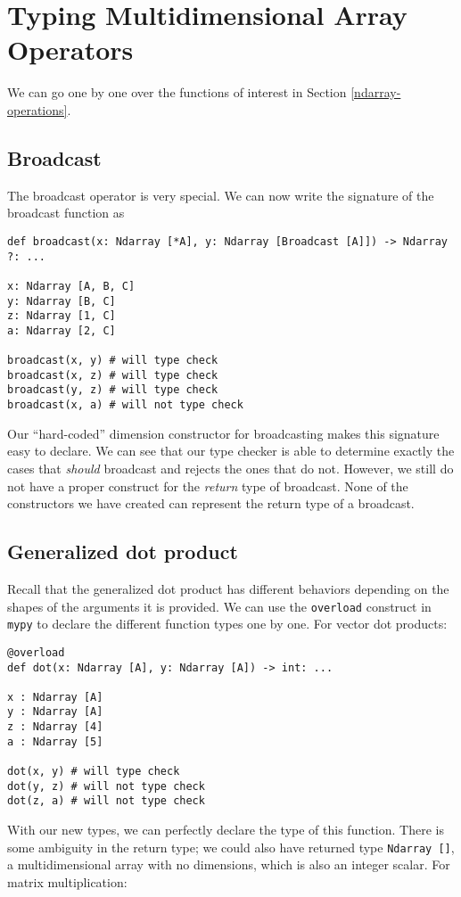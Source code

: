 \documentclass{report}
\begin{document}
\section{Typing Multidimensional Array Operators}

We can go one by one over the functions of interest in Section \ref{ndarray-operations}.

\subsection{Broadcast}

The broadcast operator is very special. We can now write the signature of the broadcast function as

\begin{singlespace*}
\begin{verbatim}
def broadcast(x: Ndarray [*A], y: Ndarray [Broadcast [A]]) -> Ndarray ?: ...

x: Ndarray [A, B, C]
y: Ndarray [B, C]
z: Ndarray [1, C]
a: Ndarray [2, C]

broadcast(x, y) # will type check
broadcast(x, z) # will type check
broadcast(y, z) # will type check
broadcast(x, a) # will not type check\end{verbatim}
\end{singlespace*}
Our ``hard-coded'' dimension constructor for broadcasting makes this signature easy to declare. We can see that our type checker is able to determine exactly the cases that \textit{should} broadcast and rejects the ones that do not. However, we still do not have a proper construct for the \textit{return} type of broadcast. None of the constructors we have created can represent the return type of a broadcast.

\subsection{Generalized dot product}
Recall that the generalized dot product has different behaviors depending on the shapes of the arguments it is provided. We can use the \texttt{overload} construct in \texttt{mypy} to declare the different function types one by one. For vector dot products:

\begin{singlespace*}
\begin{verbatim}
@overload
def dot(x: Ndarray [A], y: Ndarray [A]) -> int: ...

x : Ndarray [A]
y : Ndarray [A]
z : Ndarray [4]
a : Ndarray [5]

dot(x, y) # will type check
dot(y, z) # will not type check
dot(z, a) # will not type check
\end{verbatim}
\end{singlespace*}
With our new types, we can perfectly declare the type of this function. There is some ambiguity in the return type; we could also have returned type \texttt{Ndarray []}, a multidimensional array with no dimensions, which is also an integer scalar. For matrix multiplication:
\end{document}
